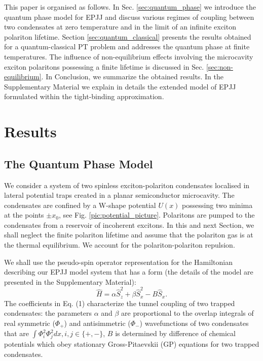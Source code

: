 \documentclass[fleqn,10pt]{wlscirep}
\begin{document}
This paper is organised as follows.
In Sec. \ref{sec:quantum_phase} we introduce the quantum phase model for EPJJ and discuss various regimes of coupling between two condensates at zero temperature and in the limit of an infinite exciton polariton lifetime.
Section \ref{sec:quantum_classical} presents the results obtained for a quantum-classical PT problem and addresses the quantum phase at finite temperatures.
The influence of non-equilibrium effects involving the microcavity exciton polaritons possessing a finite lifetime is discussed in Sec. \ref{sec:non-equilibrium}.      
In Conclusion, we summarize the obtained results.
In the Supplementary Material we explain in details the extended model of EPJJ formulated within the tight-binding approximation.
 
\section*{Results} 
 
\subsection*{The Quantum Phase Model \label{sec:quantum_phase}}

We consider a system of two spinless exciton-polariton condensates localised in lateral potential traps created in a planar semiconductor microcavity.
The condensates are confined by a W-shape potential $U(x)$ possessing two minima at the points $\pm x_0$, see Fig. \ref{pic:potential_picture}.
Polaritons are pumped to the condensates from a reservoir of incoherent excitons. In this and next Section, we shall neglect the finite polariton lifetime and assume that the polariton gas is at the thermal equilibrium.   
We account for the polariton-polariton repulsion.

We shall use the pseudo-spin operator representation for the Hamiltonian describing our EPJJ model system that has a form (the details of the model are presented in the Supplementary Material): 
%
\begin{equation}
\hat{H} = \alpha \hat{S}_z^2 + \beta \hat{S}_x^2 - B \hat{S}_x.
\label{eq:hamiltonian_spin}
\end{equation}
%
The coefficients in Eq. (1) characterize the tunnel coupling of two trapped condensates:
the parameters $\alpha$ and $\beta$ are proportional to the overlap integrals of real symmetric ($\Phi_+$) and antisimmetric ($\Phi_-$) wavefunctions of two condensates that are
$\int \Phi_i^2 \Phi_j^2 dx, i,j \in \{+,-\}$, $B$ is determined by difference of chemical potentials which obey stationary Gross-Pitaevskii (GP) equations for two trapped condensates.
\end{document}
